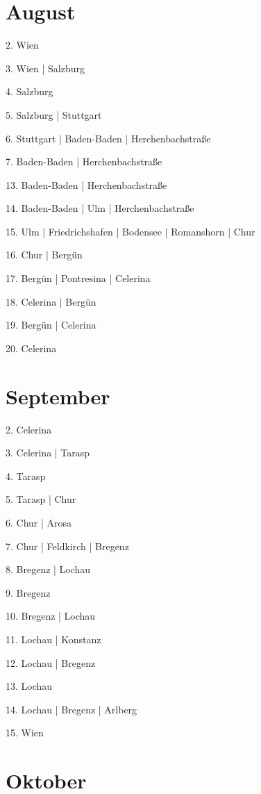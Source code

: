 \documentclass[twoside=false,titlepage=false,open=any, parskip=never, fontsize=10pt, headings=small, chapterprefix=false, appendixprefix=false, DIV=15]{scrbook}
\begin{document}
\begin{multicols}{3}
            \section*{August}
            2. Wien\par
            3. Wien | Salzburg\par
            4. Salzburg\par
            5. Salzburg | Stuttgart\par
            6. Stuttgart | Baden-Baden | Herchenbachstraße\par
            7. Baden-Baden | Herchenbachstraße\par
            13. Baden-Baden | Herchenbachstraße\par
            14. Baden-Baden | Ulm | Herchenbachstraße\par
            15. Ulm | Friedrichshafen | Bodensee | Romanshorn | Chur\par
            16. Chur | Bergün\par
            17. Bergün | Pontresina | Celerina\par
            18. Celerina | Bergün\par
            19. Bergün | Celerina\par
            20. Celerina\par
            \section*{September}
            2. Celerina\par
            3. Celerina | Tarasp\par
            4. Tarasp\par
            5. Tarasp | Chur\par
            6. Chur | Arosa\par
            7. Chur | Feldkirch | Bregenz\par
            8. Bregenz | Lochau\par
            9. Bregenz\par
            10. Bregenz | Lochau\par
            11. Lochau | Konstanz\par
            12. Lochau | Bregenz\par
            13. Lochau\par
            14. Lochau | Bregenz | Arlberg\par
            15. Wien\par
            \section*{Oktober}

\end{multicols}
\end{document}

